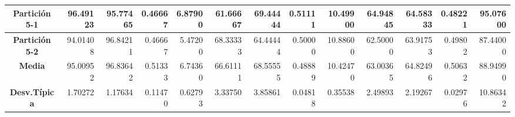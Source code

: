 \documentclass[a4paper,11pt]{article}
\begin{document}
\begin{table}[H]
\begin{adjustbox}{width=1.1\textwidth}
\begin{tabular}{|c|r|r|r|r|r|r|r|r|r|r|r|r|}
  \textbf{Partición 5-1} & 96.49123 & 95.77465 & 0.46667 & 6.87900 & 61.66667 & 69.44444 & 0.51111 & 10.49900 & 64.94845 & 64.58333 & 0.48221 & 95.07600 \\ \hline
  \textbf{Partición 5-2} & 94.01408 & 96.84211 & 0.46667 & 5.47200 & 68.33333 & 64.44444 & 0.50000 & 10.88600 & 62.50000 & 63.91753 & 0.49802 & 87.44000 \\ \hline
  \textbf{Media} & 95.00952 & 96.83642 & 0.51333 & 6.74360 & 66.61111 & 68.55555 & 0.48889 & 10.42470 & 63.00365 & 64.82496 & 0.50632 & 88.94990 \\ \hline
  \textbf{Desv.Típica} & 1.70272 & 1.17634 & 0.11470 & 0.62793 & 3.33750 & 3.85861 & 0.04818 & 0.35538 & 2.49893 & 2.19267 & 0.02976 & 10.86342 \\ \hline
  \end{tabular}
  \end{adjustbox}
  \label{AM1}
  \end{table}
  
\end{document}
